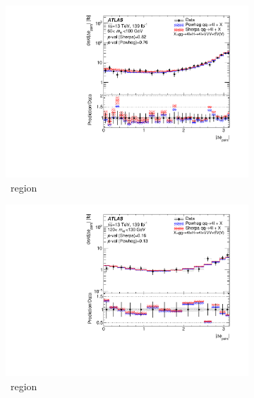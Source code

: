 \begin{figure}[H]
    \begin{subfigure}{.49\textwidth}\centering
      \includegraphics[width=.95\linewidth]{Figures/m4l/UnfoldedResults/Unfolded_Data_deltaPhiPairs_m4l60-100.pdf}\caption{\ZFourL \ region}\label{fig:sub-first}
    \end{subfigure}
    \begin{subfigure}{.49\textwidth}\centering
      \includegraphics[width=.95\linewidth]{Figures/m4l/UnfoldedResults/Unfolded_Data_deltaPhiPairs_m4l120-130.pdf} \caption{\HFourL \ region}\label{fig:sub-second}
    \end{subfigure}
    \begin{subfigure}{.49\textwidth}\centering

\end{subfigure}
\end{figure}
